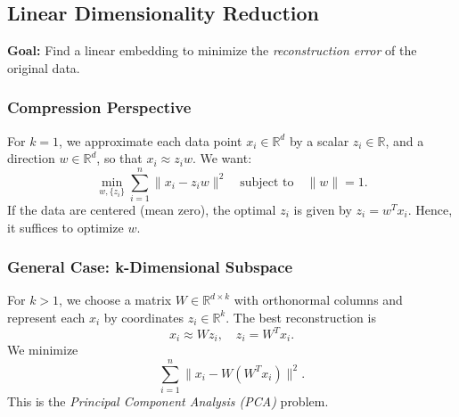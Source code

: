 \documentclass[twocolumn]{article}
\begin{document}
\begin{spacing}{1}

\subsection{Linear Dimensionality Reduction}
\textbf{Goal:} Find a linear embedding to minimize the \emph{reconstruction error} of the original data.

\subsubsection{Compression Perspective}
For $k=1$, we approximate each data point $x_i \in \mathbb{R}^d$ by a scalar $z_i \in \mathbb{R}$, and a direction $w \in \mathbb{R}^d$, so that $x_i \approx z_i w$. We want:
\[
    \min_{w, \{z_i\}} \sum_{i=1}^n \| x_i - z_i w \|^2 \quad
    \text{subject to} \quad \|w\| = 1.
\]
If the data are centered (mean zero), the optimal $z_i$ is given by $z_i = w^T x_i$. Hence, it suffices to optimize $w$.

\subsubsection{General Case: k-Dimensional Subspace}
For $k>1$, we choose a matrix $W \in \mathbb{R}^{d \times k}$ with orthonormal columns and represent each $x_i$ by coordinates $z_i \in \mathbb{R}^k$. The best reconstruction is
\[
    x_i \approx W z_i, 
    \quad z_i = W^T x_i.
\]
We minimize
\[
    \sum_{i=1}^n \| x_i - W(W^T x_i) \|^2.
\]
This is the \emph{Principal Component Analysis (PCA)} problem.


\end{spacing}
\end{document}
